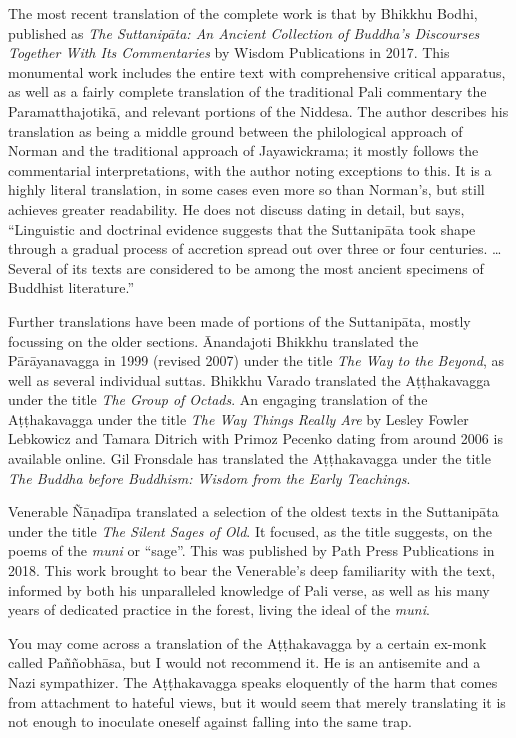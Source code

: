 \documentclass[12pt,openany]{book}%
\begin{document}
The most recent translation of the complete work is that by Bhikkhu Bodhi, published as \textit{The \textsanskrit{Suttanipāta}: An Ancient Collection of Buddha's Discourses Together With Its Commentaries} by Wisdom Publications in 2017. This monumental work includes the entire text with comprehensive critical apparatus, as well as a fairly complete translation of the traditional Pali commentary the \textsanskrit{Paramatthajotikā}, and relevant portions of the Niddesa. The author describes his translation as being a middle ground between the philological approach of Norman and the traditional approach of Jayawickrama; it mostly follows the commentarial interpretations, with the author noting exceptions to this. It is a highly literal translation, in some cases even more so than Norman’s, but still achieves greater readability. He does not discuss dating in detail, but says, “Linguistic and doctrinal evidence suggests that the \textsanskrit{Suttanipāta} took shape through a gradual process of accretion spread out over three or four centuries. … Several of its texts are considered to be among the most ancient specimens of Buddhist literature.”

Further translations have been made of portions of the \textsanskrit{Suttanipāta}, mostly focussing on the older sections. Ānandajoti Bhikkhu translated the \textsanskrit{Pārāyanavagga} in 1999 (revised 2007) under the title \textit{The Way to the Beyond}, as well as several individual suttas. Bhikkhu Varado translated the \textsanskrit{Aṭṭhakavagga} under the title \textit{The Group of Octads}. An engaging translation of the \textsanskrit{Aṭṭhakavagga} under the title \textit{The Way Things Really Are} by Lesley Fowler Lebkowicz and Tamara Ditrich with Primoz Pecenko dating from around 2006 is available online. Gil Fronsdale has translated the \textsanskrit{Aṭṭhakavagga} under the title \textit{The Buddha before Buddhism: Wisdom from the Early Teachings}.

Venerable \textsanskrit{Ñāṇadīpa} translated a selection of the oldest texts in the \textsanskrit{Suttanipāta} under the title \textit{The Silent Sages of Old}. It focused, as the title suggests, on the poems of the \textit{muni} or “sage”. This was published by Path Press Publications in 2018. This work brought to bear the Venerable’s deep familiarity with the text, informed by both his unparalleled knowledge of Pali verse, as well as his many years of dedicated practice in the forest, living the ideal of the \textit{muni}.

You may come across a translation of the \textsanskrit{Aṭṭhakavagga} by a certain ex-monk called \textsanskrit{Paññobhāsa}, but I would not recommend it. He is an antisemite and a Nazi sympathizer. The \textsanskrit{Aṭṭhakavagga} speaks eloquently of the harm that comes from attachment to hateful views, but it would seem that merely translating it is not enough to inoculate oneself against falling into the same trap.
\end{document}
